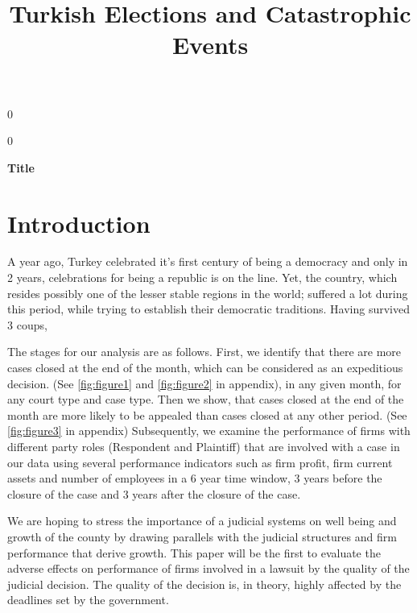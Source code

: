 \documentclass[12pt]{article}
\newcommand{\blind}{0}
\begin{document}
%

\def\spacingset#1{\renewcommand{\baselinestretch}%
{#1}\small\normalsize} \spacingset{1}



\blind
{
  \title{\bf Turkish Elections and Catastrophic Events}
    {
}

  \maketitle
} \fi

\blind
{
  \bigskip
  \bigskip
  \bigskip
  \begin{center}
    {\LARGE\bf Title}
\end{center}
  \medskip
} \fi

\spacingset{1.45} %
\section{Introduction}
\label{sec:intro}

A year ago, Turkey celebrated it's first century of being a democracy and only in 2 years, celebrations for being a republic is on the line. Yet, the country, which resides possibly one of the lesser stable regions in the world; suffered a lot during this period, while trying to establish their democratic traditions. Having survived 3 coups,  



The stages for our analysis are as follows. 
First, we identify that there are more cases closed at the end of the month, which can be considered as an expeditious decision. (See \ref{fig:figure1} and \ref{fig:figure2} in appendix), in any given month, for any court type and case type. Then we show, that cases closed at the end of the month are more likely to be appealed than cases closed at any other period. (See \ref{fig:figure3} in appendix) Subsequently, we examine the performance of firms with different party roles (Respondent and Plaintiff) that are involved with a case in our data using several performance indicators such as firm profit, firm current assets and number of employees in a 6 year time window, 3 years before the closure of the case and 3 years after the closure of the case.  

We are hoping to stress the importance of a judicial systems on well being and growth of the county by drawing parallels with the judicial structures and firm performance that derive growth. This paper will be the first to evaluate the adverse effects on performance of firms involved in a lawsuit by the quality of the judicial decision. The quality of the decision is, in theory, highly affected by the deadlines set by the government.
\end{document}
